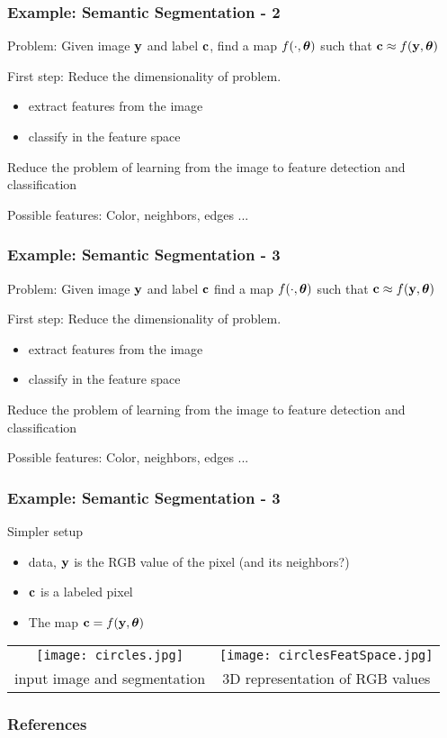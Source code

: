 \documentclass[12pt,fleqn]{beamer}
\begin{document}
\begin{frame}\frametitle{Example: Semantic Segmentation - 2}

Problem: Given image ${\bf y}$ and label ${\bf c}$, find a map $f(\cdot,{\boldsymbol \theta})$ such that ${\bf c}  \approx f({\bf y},{\boldsymbol \theta})$ 

\bigskip
\pause

First step: Reduce the dimensionality of problem.
\begin{itemize}
\item extract features from the image
\item classify in the feature space
\end{itemize}

Reduce the problem of learning from the image to feature
detection and classification

\pause
\bigskip

Possible features: Color, neighbors, edges ...

\bigskip


\end{frame}
\begin{frame}\frametitle{Example: Semantic Segmentation - 3}

Problem: Given image ${\bf y}$ and label ${\bf c}$ find a map $f(\cdot,{\boldsymbol \theta})$ such that ${\bf c}  \approx f({\bf y},{\boldsymbol \theta})$ 

\bigskip
\pause

First step: Reduce the dimensionality of problem.
\begin{itemize}
\item extract features from the image
\item classify in the feature space
\end{itemize}

Reduce the problem of learning from the image to feature
detection and classification

\pause
\bigskip

Possible features: Color, neighbors, edges ...

\bigskip


\end{frame}


\begin{frame}\frametitle{Example: Semantic Segmentation - 3}


Simpler setup
\begin{itemize}
\item data, ${\bf y}$ is the RGB value of the pixel (and its neighbors?)  
\item ${\bf c}$ is a labeled pixel
\item The map ${\bf c}  = f({\bf y},{\boldsymbol \theta})$ 
\end{itemize}

\begin{tabular}{cc}
\texttt{[image: circles.jpg]} &
\texttt{[image: circlesFeatSpace.jpg]} \\
input image and segmentation & 3D representation of RGB values \\
\end{tabular}

\end{frame}


\begin{frame}[allowframebreaks]
	\frametitle{References}
 


\end{frame}
\end{document}
